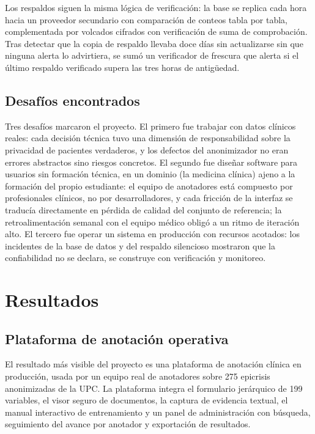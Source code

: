 \documentclass[12pt,letterpaper]{article}
\begin{document}
Los respaldos siguen la misma lógica de verificación: la base se replica cada hora hacia un proveedor secundario con comparación de conteos tabla por tabla, complementada por volcados cifrados con verificación de suma de comprobación. Tras detectar que la copia de respaldo llevaba doce días sin actualizarse sin que ninguna alerta lo advirtiera, se sumó un verificador de frescura que alerta si el último respaldo verificado supera las tres horas de antigüedad.

\subsection{Desafíos encontrados}

Tres desafíos marcaron el proyecto. El primero fue trabajar con datos clínicos reales: cada decisión técnica tuvo una dimensión de responsabilidad sobre la privacidad de pacientes verdaderos, y los defectos del anonimizador no eran errores abstractos sino riesgos concretos. El segundo fue diseñar software para usuarios sin formación técnica, en un dominio (la medicina clínica) ajeno a la formación del propio estudiante: el equipo de anotadores está compuesto por profesionales clínicos, no por desarrolladores, y cada fricción de la interfaz se traducía directamente en pérdida de calidad del conjunto de referencia; la retroalimentación semanal con el equipo médico obligó a un ritmo de iteración alto. El tercero fue operar un sistema en producción con recursos acotados: los incidentes de la base de datos y del respaldo silencioso mostraron que la confiabilidad no se declara, se construye con verificación y monitoreo.

\section{Resultados}

\subsection{Plataforma de anotación operativa}

El resultado más visible del proyecto es una plataforma de anotación clínica en producción, usada por un equipo real de anotadores sobre 275 epicrisis anonimizadas de la UPC. La plataforma integra el formulario jerárquico de 199 variables, el visor seguro de documentos, la captura de evidencia textual, el manual interactivo de entrenamiento y un panel de administración con búsqueda, seguimiento del avance por anotador y exportación de resultados.
\end{document}
